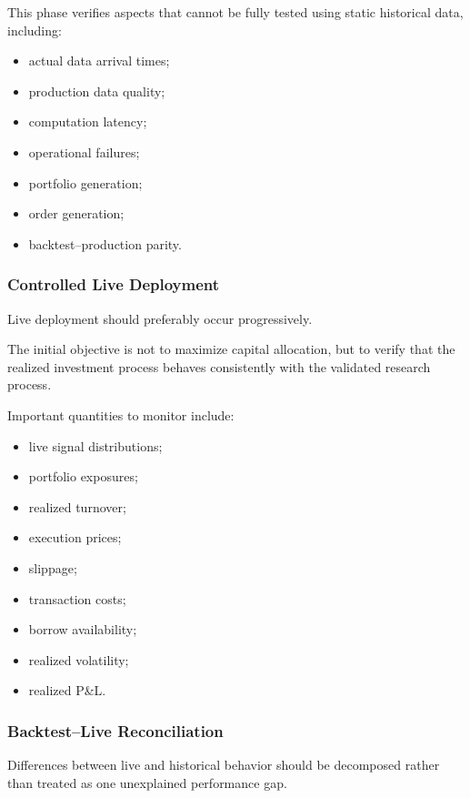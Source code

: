 \documentclass[11pt,a4paper]{article}
\begin{document}
This phase verifies aspects that cannot be fully tested using static historical
data, including:

\begin{itemize}
    \item actual data arrival times;
    \item production data quality;
    \item computation latency;
    \item operational failures;
    \item portfolio generation;
    \item order generation;
    \item backtest--production parity.
\end{itemize}


\subsubsection{Controlled Live Deployment}

Live deployment should preferably occur progressively.

The initial objective is not to maximize capital allocation, but to verify that
the realized investment process behaves consistently with the validated
research process.

Important quantities to monitor include:

\begin{itemize}
    \item live signal distributions;
    \item portfolio exposures;
    \item realized turnover;
    \item execution prices;
    \item slippage;
    \item transaction costs;
    \item borrow availability;
    \item realized volatility;
    \item realized P\&L.
\end{itemize}


\subsubsection{Backtest--Live Reconciliation}

Differences between live and historical behavior should be decomposed rather
than treated as one unexplained performance gap.
\end{document}
